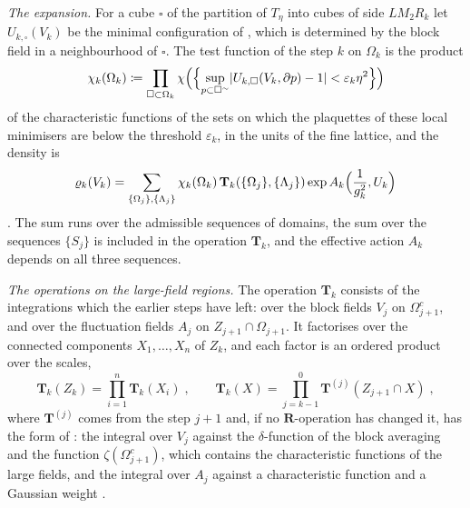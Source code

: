 \documentclass[11pt]{preprint}
\DeclarePairedDelimiter{\abs}{\lvert}{\rvert}
\numberwithin{equation}{section}
\theoremstyle{definition}
\theoremstyle{remark}
\theoremstyle{plain}
\begin{document}
\emph{The expansion.} For a cube $\square$ of the partition of $T_\eta$ into cubes of side $LM_2R_k$ let $U_{k,\square}(V_k)$ be the minimal configuration of \cite[(2.16), p.~257]{BalabanCRE}, which is determined by the block field in a neighbourhood of $\square$. The test function of the step $k$ on $\Omega_k$ is the product
\begin{equation}\label{eq:test-function}
    \chi_k(\Omega_k) \coloneqq \prod_{\square \subset \Omega_k}\chi\Bigl(\Bigl\{ \sup_{p \subset \square^{\sim}}\abs{U_{k,\square}(V_k, \partial p) - 1} < \varepsilon_k\eta^2 \Bigr\}\Bigr)
\end{equation}
of the characteristic functions of the sets on which the plaquettes of these local minimisers are below the threshold $\varepsilon_k$, in the units of the fine lattice, and the density is
\begin{equation}\label{eq:density-expansion}
    \varrho_k(V_k) = \sum_{\{ \Omega_j \}, \{ \Lambda_j \}}\chi_k(\Omega_k)\,\mathbf T_k(\{ \Omega_j \}, \{ \Lambda_j \})\exp A_k\Bigl(\frac{1}{g_k^2}, U_k\Bigr)
\end{equation}
\cite[(2.17), (2.18), p.~257]{BalabanCRE}. The sum runs over the admissible sequences of domains, the sum over the sequences $\{ S_j \}$ is included in the operation $\mathbf T_k$, and the effective action $A_k$ depends on all three sequences.

\emph{The operations on the large-field regions.} The operation $\mathbf T_k$ consists of the integrations which the earlier steps have left: over the block fields $V_j$ on $\Omega_{j+1}^c$, and over the fluctuation fields $A_j$ on $Z_{j+1} \cap \Omega_{j+1}$. It factorises over the connected components $X_1, \dots, X_n$ of $Z_k$, and each factor is an ordered product over the scales,
\begin{equation}\label{eq:large-field-operations}
    \mathbf T_k(Z_k) = \prod_{i=1}^{n}\mathbf T_k(X_i)\;,
    \qquad
    \mathbf T_k(X) = \prod_{j=k-1}^{0}\mathbf T^{(j)}(Z_{j+1} \cap X)\;,
\end{equation}
where $\mathbf T^{(j)}$ comes from the step $j + 1$ and, if no $\mathbf R$-operation has changed it, has the form of \cite[(2.21), p.~258]{BalabanCRE}: the integral over $V_j$ against the $\delta$-function of the block averaging and the function $\zeta(\Omega_{j+1}^c)$, which contains the characteristic functions of the large fields, and the integral over $A_j$ against a characteristic function and a Gaussian weight \cite[(2.19), (2.20), p.~258]{BalabanCRE}.
\end{document}
